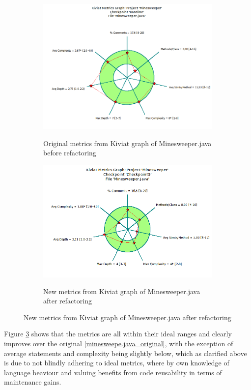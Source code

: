 \documentclass[UKenglish]{article}  %
\begin{document}
\begin{figure}[h]
	\begin{subfigure}[b]{0.5\textwidth}
		\caption{Original metrics from Kiviat graph of Minesweeper.java before refactoring}
		\includegraphics[width=\textwidth]{Minesweeper_java-kiviat-metrics-graph-original.png}
		\label{minesweeper.java_original}
	\end{subfigure}
	\begin{subfigure}[b]{0.5\textwidth}
		\caption{New metrics from Kiviat graph of Minesweeper.java after refactoring}
		\includegraphics[width=\textwidth]{Minesweeper_java-kiviat-metrics-graph-final.png}
		\label{minesweeper.java_final}
	\end{subfigure}
\end{figure}

Figure \ref{minesweeper.java_final} shows that the metrics are all within their
ideal ranges and clearly improves over the original
\ref{minesweepe.java_original}, with the exception of average statements and
complexity being slightly below, which as clarified above is due to not
blindly adhering to ideal metrics, where by own knowledge of language beaviour
and valuing benefits from code reusability in terms of maintenance gains.
\end{document}

